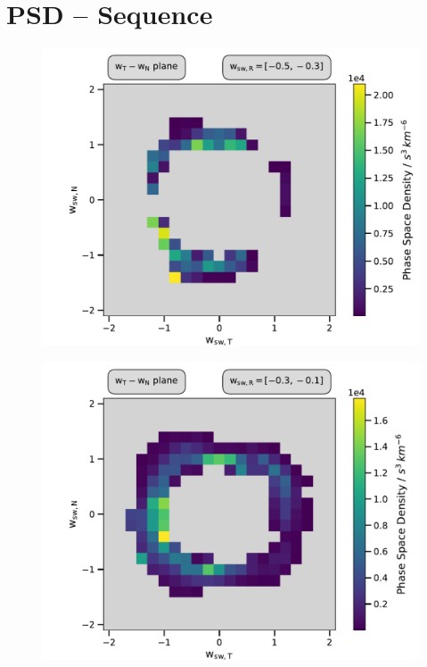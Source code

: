 
\chapter{PSD -- Sequence} %

\label{Appendix} %



\begin{figure}[h]
	\includegraphics[width=1.\textwidth]{Figures/slices_50_-5.pdf}
\end{figure}

\begin{figure}[h]
	\includegraphics[width=1.\textwidth]{Figures/slices_50_-3.pdf}
\end{figure}

